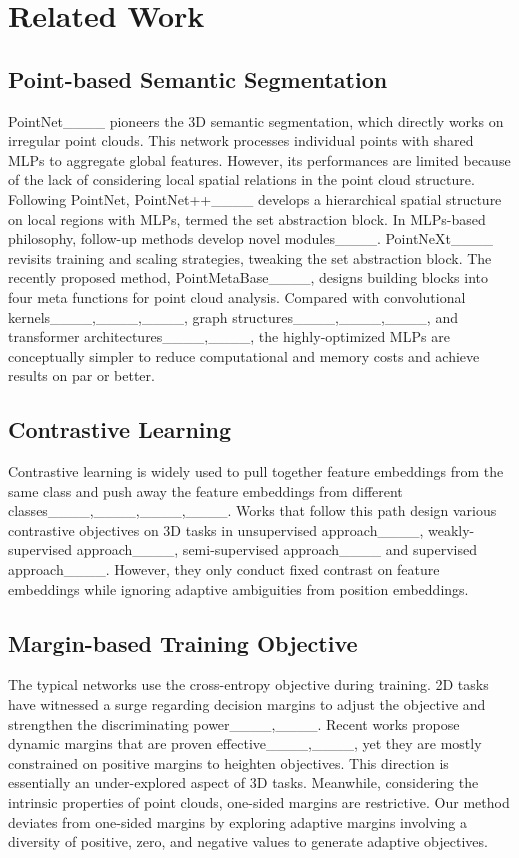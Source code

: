 \section{Related Work}
\label{sec:rw}


\subsection{Point-based Semantic Segmentation}

PointNet____ pioneers the 3D semantic segmentation, which directly works on irregular point clouds. This network processes individual points with shared MLPs to aggregate global features. However, its performances are limited because of the lack of considering local spatial relations in the point cloud structure. Following PointNet, PointNet++____ develops a hierarchical spatial structure on local regions with MLPs, termed the set abstraction block. In MLPs-based philosophy, follow-up methods develop novel modules____. PointNeXt____ revisits training and scaling strategies, tweaking the set abstraction block. The recently proposed method, PointMetaBase____, designs building blocks into four meta functions for point cloud analysis. Compared with convolutional kernels____,____,____, graph structures____,____,____, and transformer architectures____,____, the highly-optimized MLPs are conceptually simpler to reduce computational and memory costs and achieve results on par or better.


\subsection{Contrastive Learning}

Contrastive learning is widely used to pull together feature embeddings from the same class and push away the feature embeddings from different classes____,____,____,____. Works that follow this path design various contrastive objectives on 3D tasks in unsupervised approach____, weakly-supervised approach____, semi-supervised approach____ and supervised approach____. However, they only conduct fixed contrast on feature embeddings while ignoring adaptive ambiguities from position embeddings. 



\subsection{Margin-based Training Objective}

The typical networks use the cross-entropy objective during training. 2D tasks have witnessed a surge regarding decision margins to adjust the objective and strengthen the discriminating power____,____. Recent works propose dynamic margins that are proven effective____,____, yet they are mostly constrained on positive margins to heighten objectives. This direction is essentially an under-explored aspect of 3D tasks. Meanwhile, considering the intrinsic properties of point clouds, one-sided margins are restrictive. Our method deviates from one-sided margins by exploring adaptive margins involving a diversity of positive, zero, and negative values to generate adaptive objectives.